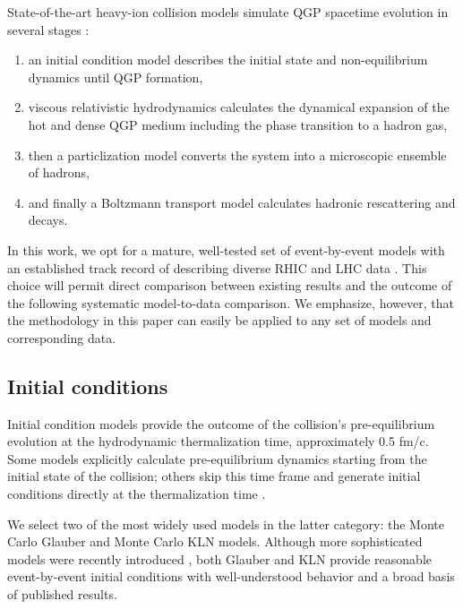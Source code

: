 \documentclass[aps,prc,reprint,superscriptaddress,amsmath]{revtex4-1}
\begin{document}
State-of-the-art heavy-ion collision models simulate QGP spacetime evolution in several stages \cite{Bass:2000ib,Teaney:2001av,Hirano:2005xf,Nonaka:2006yn,Petersen:2008dd,Song:2010mg,Schenke:2010rr,Shen:2014vra}:
\begin{enumerate}
  \item an initial condition model describes the initial state and non-equilibrium dynamics until QGP formation,
  \item viscous relativistic hydrodynamics calculates the dynamical expansion of the hot and dense QGP medium including the phase transition to a hadron gas,
  \item then a particlization model converts the system into a microscopic ensemble of hadrons,
  \item and finally a Boltzmann transport model calculates hadronic rescattering and decays.
\end{enumerate}
In this work, we opt for a mature, well-tested set of event-by-event models \cite{Shen:2014vra} with an established track record of describing diverse RHIC and LHC data \cite{Song:2010mg,Shen:2011zc,Song:2011hk}.
This choice will permit direct comparison between existing results and the outcome of the following systematic model-to-data comparison.
We emphasize, however, that the methodology in this paper can easily be applied to any set of models and corresponding data.

\subsection{Initial conditions}

Initial condition models provide the outcome of the collision's pre-equilibrium evolution at the hydrodynamic thermalization time, approximately 0.5 fm/c.
Some models explicitly calculate pre-equilibrium dynamics \cite{Schenke:2012wb} starting from the initial state of the collision; others skip this time frame and generate initial conditions directly at the thermalization time \cite{Drescher:2006pi,Miller:2007ri,Moreland:2014oya}.

We select two of the most widely used models in the latter category:
the Monte Carlo Glauber \cite{Miller:2007ri} and Monte Carlo KLN \cite{Drescher:2006pi} models.
Although more sophisticated models were recently introduced \cite{Schenke:2012wb,Moreland:2014oya}, both Glauber and KLN provide reasonable event-by-event initial conditions with well-understood behavior and a broad basis of published results.
\end{document}
